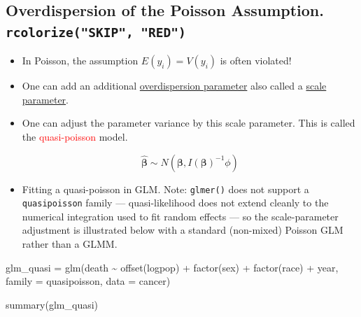 \documentclass[
  letterpaper,
  DIV=11,
  numbers=noendperiod]{scrreprt}
\newenvironment{Shaded}{\begin{snugshade}}{\end{snugshade}}
\newcommand{\AttributeTok}[1]{\textcolor[rgb]{0.40,0.45,0.13}{#1}}
\newcommand{\FunctionTok}[1]{\textcolor[rgb]{0.28,0.35,0.67}{#1}}
\newcommand{\NormalTok}[1]{\textcolor[rgb]{0.00,0.23,0.31}{#1}}
\newcommand{\OtherTok}[1]{\textcolor[rgb]{0.00,0.23,0.31}{#1}}
\newcommand{\SpecialCharTok}[1]{\textcolor[rgb]{0.37,0.37,0.37}{#1}}
\begin{document}
\hypertarget{overdispersion-of-the-poisson-assumption.-rcolorizeskip-red}{%
\subsection*{\texorpdfstring{Overdispersion of the Poisson Assumption.
\texttt{rcolorize("SKIP",\ "RED")}}{Overdispersion of the Poisson Assumption. rcolorize("SKIP", "RED")}}\label{overdispersion-of-the-poisson-assumption.-rcolorizeskip-red}}

\begin{itemize}
\item
  In Poisson, the assumption \(E(y_i) = V(y_i)\) is often violated!
\item
  One can add an additional \ul{overdispersion parameter} also called a
  \ul{scale parameter}.
\item
  One can adjust the parameter variance by this scale parameter. This is
  called the \textcolor{red}{quasi-poisson} model.

  \[
  \hat{\mathbf{\beta}} \sim N(\mathbf{\beta}, I(\mathbf{\beta})^{-1} \phi)
  \]
\item
  Fitting a quasi-poisson in GLM. Note: \texttt{glmer()} does not
  support a \texttt{quasipoisson} family --- quasi-likelihood does not
  extend cleanly to the numerical integration used to fit random effects
  --- so the scale-parameter adjustment is illustrated below with a
  standard (non-mixed) Poisson GLM rather than a GLMM.
\end{itemize}

\begin{Shaded}
\begin{Highlighting}[]
\NormalTok{glm\_quasi }\OtherTok{=} \FunctionTok{glm}\NormalTok{(death }\SpecialCharTok{\textasciitilde{}} \FunctionTok{offset}\NormalTok{(logpop) }\SpecialCharTok{+} \FunctionTok{factor}\NormalTok{(sex) }\SpecialCharTok{+} \FunctionTok{factor}\NormalTok{(race) }\SpecialCharTok{+}\NormalTok{ year,}
            \AttributeTok{family =}\NormalTok{ quasipoisson,}
            \AttributeTok{data =}\NormalTok{ cancer)}

\FunctionTok{summary}\NormalTok{(glm\_quasi)}
\end{Highlighting}
\end{Shaded}
\end{document}
